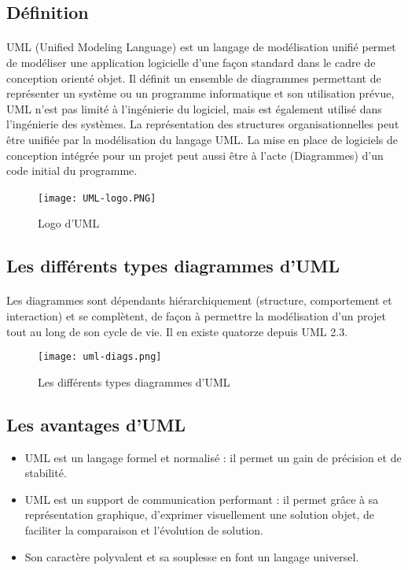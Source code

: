 \documentclass[12pt, openany]{report}
\begin{document}
\subsection{Définition}
\raggedright\paragraph{}UML (Unified Modeling Language) est un langage de modélisation unifié permet de modéliser une application logicielle d’une façon standard dans le cadre de conception orienté objet.
Il définit un ensemble de diagrammes permettant de représenter un système ou un programme informatique et son utilisation prévue, UML n’est pas limité à l’ingénierie du logiciel, mais est également utilisé dans l’ingénierie des systèmes. La représentation des structures organisationnelles peut être unifiée par la modélisation du langage UML. La mise en place de logiciels de conception intégrée pour un projet peut aussi être à l’acte (Diagrammes) d’un code initial du programme.\\

\begin{figure}[! h]
	\centering
	\texttt{[image: UML-logo.PNG]}~\\
	\caption{Logo d'UML}
\end{figure}

\raggedright\subsection{Les différents types diagrammes d’UML}
\paragraph{}Les diagrammes sont dépendants hiérarchiquement (structure, comportement et interaction) et se complètent, de façon à permettre la modélisation d'un projet tout au long de son cycle de vie. Il en existe quatorze depuis UML 2.3.

\begin{figure}[! h]
	\centering
	\texttt{[image: uml-diags.png]}
	\caption{Les différents types diagrammes d’UML}
	\label{fig:screenshot001}
\end{figure}
\subsection{Les avantages d'UML}
\begin{itemize}\renewcommand {\labelitemi }{$\bullet $}
	\item  UML est un langage formel et normalisé : il permet un gain de précision et de stabilité.
	\item UML est un support de communication performant : il permet grâce à sa représentation graphique, d'exprimer visuellement une solution objet, de faciliter la comparaison et l'évolution de solution.
	\item Son caractère polyvalent et sa souplesse en font un langage universel.
\end{itemize}
\end{document}
